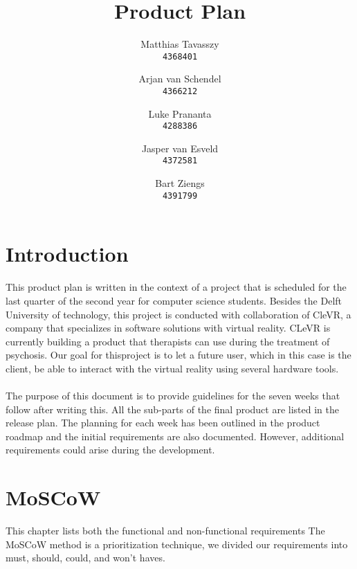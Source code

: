 \documentclass[11pt,a4paper]{report}
\title{Product Plan }
\author{
Matthias Tavasszy \\
\texttt{4368401}	
\and
Arjan van Schendel \\
\texttt{4366212}
\and
Luke Prananta \\ 
\texttt{4288386}  
\and
Jasper van Esveld \\
\texttt{4372581}
\and
Bart Ziengs \\ 
\texttt{4391799}
}
\begin{document}
\maketitle


\tableofcontents
\chapter*{Introduction}
This product plan is written in the context of a project that is scheduled for the last quarter of the second year for computer science students. Besides the Delft University of technology, this project is conducted with collaboration of CleVR, a company that specializes in software solutions with virtual reality. CLeVR is
currently building a product that therapists can use during the treatment of psychosis. Our goal for thisproject is to let a future user, which in this case is the client, be able to interact with the virtual reality
using several hardware tools. \\ \\
The purpose of this document is to provide guidelines for the seven weeks that follow after writing this.
All the sub-parts of the final product are listed in the release plan. The planning for each week has
been outlined in the product roadmap and the initial requirements are also documented. However,
additional requirements could arise during the development.
\newpage
\chapter{MoSCoW}
This chapter lists both the functional and non-functional requirements
The MoSCoW method is a prioritization technique, we divided our requirements into must, should, could, and won't haves. 
\end{document}
